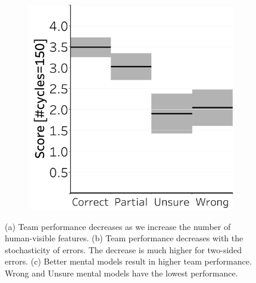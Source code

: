 \documentclass[letterpaper]{article}
\begin{document}
\begin{figure}[t]
\begin{subfigure}[b]{.47\columnwidth}
    \caption{}
    \label{fig:complexity_stochastic}
  \end{subfigure}
    \hfill
  \begin{subfigure}[b]{0.47\columnwidth}
  \centering
    \centering
    \includegraphics[width=\columnwidth]{wsl.pdf}
    \caption{}
    \label{fig:wsl}
  \end{subfigure}
  
  \caption{(a) Team performance decreases as we increase the number of human-visible features. (b) Team performance decreases with the stochasticity of errors. The decrease is much higher for two-sided errors. (c) Better mental models result in higher team performance. Wrong and Unsure mental models have the lowest performance. 
  }
  \label{fig:complexity}
\end{figure}
\end{document}
